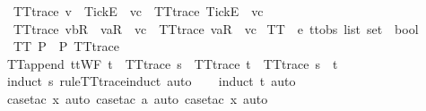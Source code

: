 \ \ {\isachardoublequoteopen}TT{}{\isacharunderscore}trace\ {\isacharparenleft}v\ {\isacharhash}\ {\isacharbrackleft}Tick{\isacharbrackright}\isactrlsub E\ {\isacharhash}\ vc{\isacharparenright}\ {\isacharequal}\ TT{}{\isacharunderscore}trace\ {\isacharparenleft}{\isacharbrackleft}Tick{\isacharbrackright}\isactrlsub E\ {\isacharhash}\ vc{\isacharparenright}{\isachardoublequoteclose}\ {\isacharbar}\isanewline
\ \ {\isachardoublequoteopen}TT{}{\isacharunderscore}trace\ {\isacharparenleft}{\isacharbrackleft}vb{\isacharbrackright}\isactrlsub R\ {\isacharhash}\ {\isacharbrackleft}va{\isacharbrackright}\isactrlsub R\ {\isacharhash}\ vc{\isacharparenright}\ {\isacharequal}\ TT{}{\isacharunderscore}trace\ {\isacharparenleft}{\isacharbrackleft}va{\isacharbrackright}\isactrlsub R\ {\isacharhash}\ vc{\isacharparenright}{\isachardoublequoteclose}\isanewline
\isanewline
{}\isamarkupfalse%
\ TT{}\ {\isacharcolon}{\isacharcolon}\ {\isachardoublequoteopen}{\isacharprime}e\ ttobs\ list\ set\ {\isasymRightarrow}\ bool{\isachardoublequoteclose}\ \isanewline
\ \ {\isachardoublequoteopen}TT{}\ P\ {\isacharequal}\ {\isacharparenleft}{\isasymforall}{\isasymrho}{\isasymin}P{\isachardot}\ TT{}{\isacharunderscore}trace\ {\isasymrho}{\isacharparenright}{\isachardoublequoteclose}\isanewline
\isanewline
{}\isamarkupfalse%
\ TT{}{\isacharunderscore}append{\isacharcolon}\ {\isachardoublequoteopen}ttWF\ t\ {\isasymLongrightarrow}\ TT{}{\isacharunderscore}trace\ s\ {\isasymLongrightarrow}\ TT{}{\isacharunderscore}trace\ t\ {\isasymLongrightarrow}\ TT{}{\isacharunderscore}trace\ {\isacharparenleft}s\ {\isacharat}\ t{\isacharparenright}{\isachardoublequoteclose}\isanewline
%
\isadelimproof
\ \ %
\endisadelimproof
%
\isatagproof
{}\isamarkupfalse%
\ {\isacharparenleft}induct\ s\ rule{\isacharcolon}TT{}{\isacharunderscore}trace{\isachardot}induct{\isacharcomma}\ auto{\isacharparenright}\isanewline
\ \ \isamarkupfalse%
\ {\isacharparenleft}induct\ t{\isacharcomma}\ auto{\isacharparenright}\isanewline
\ \ \isamarkupfalse%
\ {\isacharparenleft}case{\isacharunderscore}tac\ x{\isacharcomma}\ auto{\isacharcomma}\ case{\isacharunderscore}tac\ a{\isacharcomma}\ auto{\isacharcomma}\ case{\isacharunderscore}tac\ x{}{\isacharcomma}\ auto{\isacharparenright}\isanewline
\ \ \isamarkupfalse%
%
\endisatagproof
{\isafoldproof}%
%
\isadelimproof
